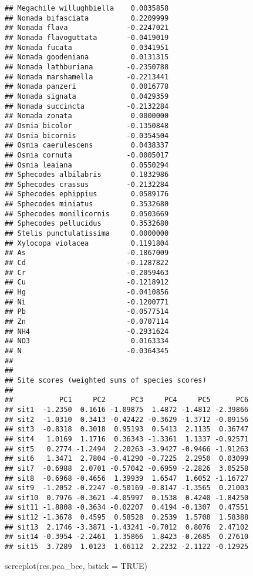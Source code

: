 \documentclass[
]{article}
\newenvironment{Shaded}{\begin{snugshade}}{\end{snugshade}}
\newcommand{\AttributeTok}[1]{\textcolor[rgb]{0.77,0.63,0.00}{#1}}
\newcommand{\ConstantTok}[1]{\textcolor[rgb]{0.00,0.00,0.00}{#1}}
\newcommand{\FunctionTok}[1]{\textcolor[rgb]{0.00,0.00,0.00}{#1}}
\newcommand{\NormalTok}[1]{#1}
\begin{document}
\begin{verbatim}
## Megachile willughbiella    0.0035858
## Nomada bifasciata          0.2209999
## Nomada flava              -0.2247021
## Nomada flavoguttata       -0.0419019
## Nomada fucata              0.0341951
## Nomada goodeniana          0.0131315
## Nomada lathburiana        -0.2350788
## Nomada marshamella        -0.2213441
## Nomada panzeri             0.0016778
## Nomada signata             0.0429359
## Nomada succincta          -0.2132284
## Nomada zonata              0.0000000
## Osmia bicolor             -0.1350848
## Osmia bicornis            -0.0354504
## Osmia caerulescens         0.0438337
## Osmia cornuta             -0.0005017
## Osmia leaiana              0.0550294
## Sphecodes albilabris       0.1832986
## Sphecodes crassus         -0.2132284
## Sphecodes ephippius        0.0589176
## Sphecodes miniatus         0.3532680
## Sphecodes monilicornis     0.0503669
## Sphecodes pellucidus       0.3532680
## Stelis punctulatissima     0.0000000
## Xylocopa violacea          0.1191804
## As                        -0.1867009
## Cd                        -0.1287822
## Cr                        -0.2059463
## Cu                        -0.1218912
## Hg                        -0.0410856
## Ni                        -0.1200771
## Pb                        -0.0577514
## Zn                        -0.0707114
## NH4                       -0.2931624
## NO3                        0.0163334
## N                         -0.0364345
## 
## 
## Site scores (weighted sums of species scores)
## 
##           PC1     PC2      PC3     PC4     PC5      PC6
## sit1  -1.2350  0.1616 -1.09875  1.4872 -1.4812 -2.39866
## sit2  -1.0310  0.3413 -0.42422 -0.3629 -1.3712 -0.09156
## sit3  -0.8318  0.3018  0.95193  0.5413  2.1135  0.36747
## sit4   1.0169  1.1716  0.36343 -1.3361  1.1337 -0.92571
## sit5   0.2774 -1.2494  2.20263 -3.9427 -0.9466 -1.91263
## sit6   1.3471  2.7804 -0.41290 -0.7225  2.2950  0.03099
## sit7  -0.6988  2.0701 -0.57042 -0.6959 -2.2826  3.05258
## sit8  -0.6968 -0.4656  1.39939  1.6547  1.6052 -1.16727
## sit9  -1.2052 -0.2247 -0.50169 -0.8147 -1.3565  0.21003
## sit10  0.7976 -0.3621 -4.05997  0.1538  0.4240 -1.84250
## sit11 -1.8808 -0.3634 -0.02207  0.4194 -0.1307  0.47551
## sit12 -1.3678  0.4595  0.58528  0.2539  1.5708  1.58388
## sit13  2.1746 -3.3871 -1.43241 -0.7012  0.8076  2.47102
## sit14 -0.3954 -2.2461  1.35866  1.8423 -0.2685  0.27610
## sit15  3.7289  1.0123  1.66112  2.2232 -2.1122 -0.12925
\end{verbatim}

\begin{Shaded}
\begin{Highlighting}[]
\FunctionTok{screeplot}\NormalTok{(res.pca\_bee, }\AttributeTok{bstick =} \ConstantTok{TRUE}\NormalTok{)}
\end{Highlighting}
\end{Shaded}
\end{document}

